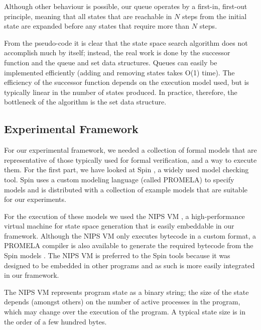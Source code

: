 \documentclass{acm_proc_article-sp}
\begin{document}
Although other behaviour is possible, our queue operates by a first-in,
first-out principle, meaning that all states that are reachable in $N$ steps
from the initial state are expanded before any states that require more than
$N$ steps.

From the pseudo-code it is clear that the state space search algorithm does not
accomplish much by itself; instead, the real work is done by the successor
function and the queue and set data structures. Queues can easily be
implemented efficiently (adding and removing states takes O(1) time).
The efficiency of the successor function depends on the execution model used,
but is typically linear in the number of states produced. In practice,
therefore, the bottleneck of the algorithm is the set data structure.

\subsection{Experimental Framework}
For our experimental framework, we needed a collection of formal models that are
representative of those typically used for formal verification, and a way to
execute them. For the first part, we have looked at Spin \cite{holzmann2004smc},
a widely used model checking tool.
Spin uses a custom modeling language (called PROMELA) to specify models and is
distributed with a collection of example models that are suitable for our
experiments.

For the execution of these models we used the NIPS VM \cite{weber2007evm}, a
high-performance virtual machine for state space generation that is easily
embeddable in our framework. Although the NIPS VM only executes bytecode in a
custom format, a PROMELA compiler is also available to generate the required
bytecode from the Spin models \cite{nipsvm}. The NIPS VM is preferred to the
Spin tools because it was designed to be embedded in other programs and as
such is more easily integrated in our framework.

The NIPS VM represents program state as a binary string; the size of the state
depends (amongst others) on the number of active processes in the program,
which may change over the execution of the program.
A typical state size is in the order of a few hundred bytes.
\end{document}
